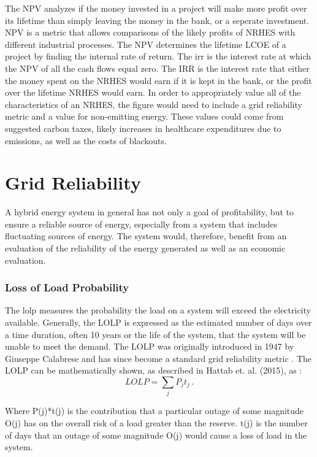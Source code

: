 \documentclass[12pt]{UIdahoMastersThesis}
\begin{document}
The NPV analyzes if the money invested in a project will make more profit over its lifetime than simply leaving the money in the bank, or a seperate investment.  NPV is a metric that allows comparisons of the likely profits of NRHES with different industrial processes.  The NPV determines the lifetime LCOE of a project by finding the internal rate of return.  The \ac{irr} is the interest rate at which the NPV of all the cash flows equal zero.  The IRR is the interest rate that either the money spent on the NRHES would earn if it is kept in the bank, or the profit over the lifetime NRHES would earn.  In order to appropriately value all of the characteristics of an NRHES, the figure would need to include a grid reliability metric and a value for non-emitting energy. These values could come from suggested carbon taxes, likely increases in healthcare expenditures due to emissions, as well as the costs of blackouts.

\section{Grid Reliability}
A hybrid energy system in general has not only a goal of profitability, but to ensure a reliable source of energy, especially from a system that includes fluctuating sources of energy. The system would, therefore, benefit from an evaluation of the reliability of the energy generated as well as an economic evaluation.
\subsubsection{Loss of Load Probability}

The \ac{lolp} measures the probability the load on a system will exceed the electricity available. Generally, the LOLP is expressed as the estimated number of days over a time duration, often 10 years or the life of the system, that the system will be unable to meet the demand. The LOLP was originally introduced in 1947 by Giuseppe Calabrese and has since become a standard grid reliability metric \cite{calabrese1947generating}. The LOLP can be mathematically shown, as described in Hattab et. al. (2015), as \cite{Hattab2015}:
\begin{equation*}
LOLP =\sum_{j} P_jt_j\,.
\end{equation*}

Where P(j)*t(j) is the contribution that a particular outage of some magnitude O(j) has on the overall risk of a load greater than the reserve. t(j) is the number of days that an outage of some magnitude O(j) would cause a loss of load in the system\cite{Hattab2015}.
\end{document}

